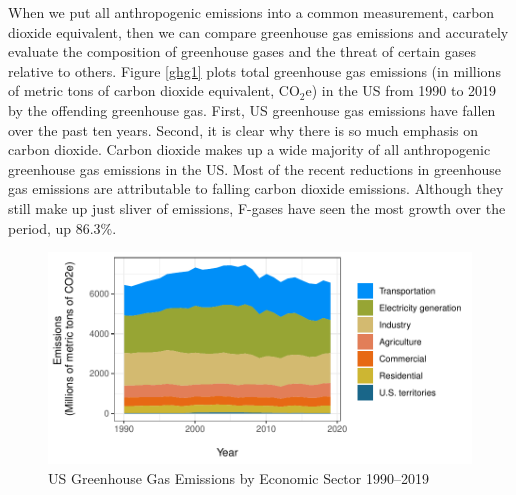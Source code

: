 When we put all anthropogenic emissions into a common measurement, carbon dioxide equivalent, then we can compare greenhouse gas emissions and accurately evaluate the composition of greenhouse gases and the threat of certain gases relative to others. Figure \ref{ghg1} plots total greenhouse gas emissions (in millions of metric tons of carbon dioxide equivalent, CO$_2$e) in the US from 1990 to 2019 by the offending greenhouse gas. First, US greenhouse gas emissions have fallen over the past ten years. Second, it is clear why there is so much emphasis on carbon dioxide. Carbon dioxide makes up a wide majority of all anthropogenic greenhouse gas emissions in the US. Most of the recent reductions in greenhouse gas emissions are attributable to falling carbon dioxide emissions. Although they still make up just sliver of emissions, F-gases have seen the most growth over the period, up 86.3\%. 

\begin{figure}
\caption{US Greenhouse Gas Emissions by Economic Sector 1990--2019 \label{ghgeconomic}}
\centering
\includegraphics[width=\textwidth]{figures/chapter1_figures/ghg_economic.pdf}
\end{figure}

